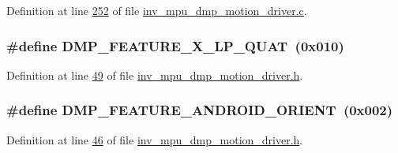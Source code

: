 Definition at line \hyperlink{inv__mpu__dmp__motion__driver_8c_source_l00252}{252} of file \hyperlink{inv__mpu__dmp__motion__driver_8c_source}{inv\+\_\+mpu\+\_\+dmp\+\_\+motion\+\_\+driver.\+c}.

\subsubsection[{\texorpdfstring{D\+M\+P\+\_\+\+F\+E\+A\+T\+U\+R\+E\+\_\+6\+X\+\_\+\+L\+P\+\_\+\+Q\+U\+AT}{DMP_FEATURE_6X_LP_QUAT}}]{\setlength{\rightskip}{0pt plus 5cm}\#define D\+M\+P\+\_\+\+F\+E\+A\+T\+U\+R\+E\+\_\+X\+\_\+\+L\+P\+\_\+\+Q\+U\+AT~(0x010)}\hypertarget{group___d_r_i_v_e_r_s_gae879a3c9729f9e1be5e6d7c9211c69c0}{}\label{group___d_r_i_v_e_r_s_gae879a3c9729f9e1be5e6d7c9211c69c0}


Definition at line \hyperlink{inv__mpu__dmp__motion__driver_8h_source_l00049}{49} of file \hyperlink{inv__mpu__dmp__motion__driver_8h_source}{inv\+\_\+mpu\+\_\+dmp\+\_\+motion\+\_\+driver.\+h}.

\subsubsection[{\texorpdfstring{D\+M\+P\+\_\+\+F\+E\+A\+T\+U\+R\+E\+\_\+\+A\+N\+D\+R\+O\+I\+D\+\_\+\+O\+R\+I\+E\+NT}{DMP_FEATURE_ANDROID_ORIENT}}]{\setlength{\rightskip}{0pt plus 5cm}\#define D\+M\+P\+\_\+\+F\+E\+A\+T\+U\+R\+E\+\_\+\+A\+N\+D\+R\+O\+I\+D\+\_\+\+O\+R\+I\+E\+NT~(0x002)}\hypertarget{group___d_r_i_v_e_r_s_gaf2b250fc928390d562f7bd80300ce419}{}\label{group___d_r_i_v_e_r_s_gaf2b250fc928390d562f7bd80300ce419}


Definition at line \hyperlink{inv__mpu__dmp__motion__driver_8h_source_l00046}{46} of file \hyperlink{inv__mpu__dmp__motion__driver_8h_source}{inv\+\_\+mpu\+\_\+dmp\+\_\+motion\+\_\+driver.\+h}.

